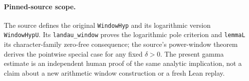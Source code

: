 \paragraph{Pinned-source scope.}
The source defines the original \texttt{WindowHyp} and its logarithmic
version \texttt{WindowHypU}.  Its \texttt{landau\_window} proves the
logarithmic pole criterion and \texttt{lemmaL} its character-family
zero-free consequence;
the source's power-window theorem derives the
pointwise special case for any fixed $\delta>0$.
The present gamma estimate is an independent human proof of the
same analytic implication, not a claim about a new arithmetic
window construction or a fresh Lean replay.
